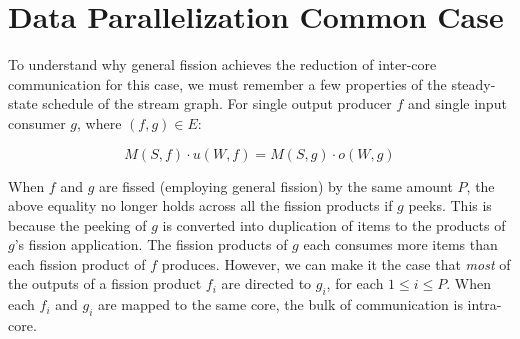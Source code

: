 \section{Data Parallelization Common Case}



To understand why general fission achieves the reduction of inter-core
communication for this case, we must remember a few properties of the
steady-state schedule of the stream graph.  For single output producer
$f$ and single input consumer $g$, where $(f,g) \in E$:

\[ M(S, f) \cdot u(W, f) = M(S,g) \cdot o(W,g) \]

\noindent When $f$ and $g$ are fissed (employing general fission) by
the same amount $P$, the above equality no longer holds across all the
fission products if $g$ peeks.  This is because the peeking of $g$ is
converted into duplication of items to the products of $g$'s fission
application.  The fission products of $g$ each consumes more items
than each fission product of $f$ produces.  However, we can make it
the case that {\it most} of the outputs of a fission product $f_i$ are
directed to $g_i$, for each $1 \le i \le P$.  When each $f_i$ and
$g_i$ are mapped to the same core, the bulk of communication is
intra-core.

